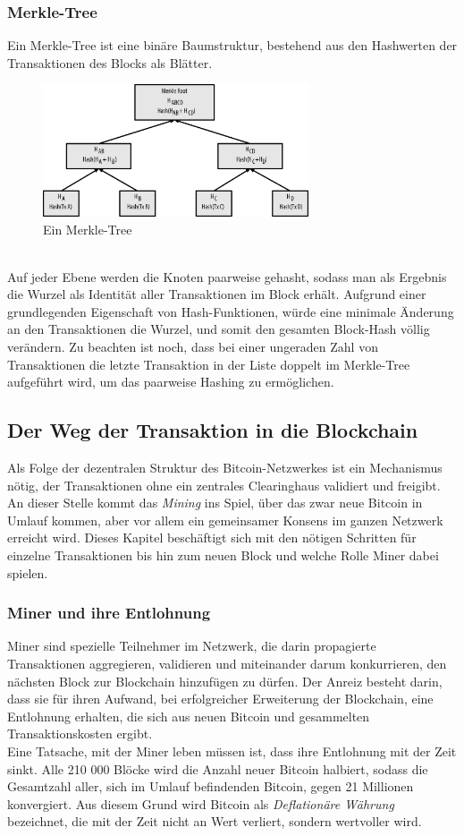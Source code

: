 \subsubsection{Merkle-Tree}
Ein Merkle-Tree ist eine binäre Baumstruktur, bestehend aus den Hashwerten der Transaktionen des Blocks als Blätter.
\begin{figure}[htpb]
	\centering
	\includegraphics[width=0.7\textwidth]{images/merkle.png}
	\caption{Ein Merkle-Tree}
	\label{6braun:fig:merkle}
\end{figure}\\
Auf jeder Ebene werden die Knoten paarweise gehasht, sodass man als Ergebnis die Wurzel als Identität aller Transaktionen im Block erhält. 
Aufgrund einer grundlegenden Eigenschaft von Hash-Funktionen, würde eine minimale Änderung an den Transaktionen die Wurzel, und somit den gesamten Block-Hash völlig verändern. 
Zu beachten ist noch, dass bei einer ungeraden Zahl von Transaktionen die letzte Transaktion in der Liste doppelt im Merkle-Tree aufgeführt wird, um das paarweise Hashing zu ermöglichen.
\subsection{Der Weg der Transaktion in die Blockchain}
Als Folge der dezentralen Struktur des Bitcoin-Netzwerkes ist ein Mechanismus nötig, der Transaktionen ohne ein zentrales Clearinghaus validiert und freigibt. An dieser Stelle kommt das \emph{Mining} ins Spiel, über das zwar neue Bitcoin in Umlauf kommen, aber vor allem ein gemeinsamer Konsens im ganzen Netzwerk erreicht wird.
Dieses Kapitel beschäftigt sich mit den nötigen Schritten für einzelne Transaktionen bis hin zum neuen Block und welche Rolle Miner dabei spielen.
\subsubsection{Miner und ihre Entlohnung}
Miner sind spezielle Teilnehmer im Netzwerk, die darin propagierte Transaktionen aggregieren, validieren und miteinander darum konkurrieren, den nächsten Block zur Blockchain hinzufügen zu dürfen. 
Der Anreiz besteht darin, dass sie für ihren Aufwand, bei erfolgreicher Erweiterung der Blockchain, eine Entlohnung erhalten, die sich aus neuen Bitcoin und gesammelten Transaktionskosten ergibt.\\
Eine Tatsache, mit der Miner leben müssen ist, dass ihre Entlohnung mit der Zeit sinkt. 
Alle 210 000 Blöcke wird die Anzahl neuer Bitcoin halbiert, sodass die Gesamtzahl aller, sich im Umlauf befindenden Bitcoin, gegen 21 Millionen konvergiert. 
Aus diesem Grund wird Bitcoin als \emph{Deflationäre Währung} bezeichnet, die mit der Zeit nicht an Wert verliert, sondern wertvoller wird.
